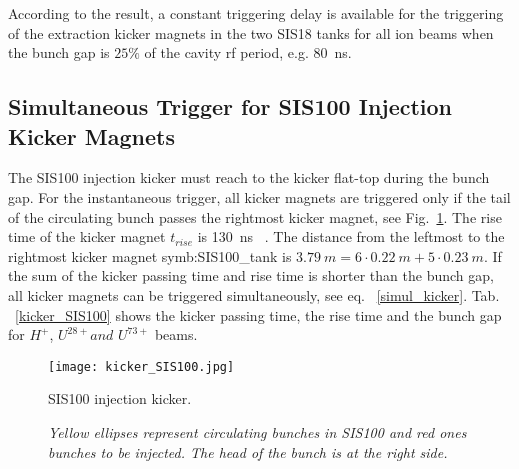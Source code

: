 \begin{table}[H]
\end{table}
According to the result, a constant triggering delay is available for the triggering of the extraction kicker magnets in the two SIS18 tanks for all ion beams when the bunch gap is $25\%$ of the cavity rf period, e.g. \SI{80}{ns}.  

\subsection{Simultaneous Trigger for SIS100 Injection Kicker Magnets}
The SIS100 injection kicker must reach to the kicker flat-top during the bunch gap. For the instantaneous trigger, all kicker magnets are triggered only if the tail of the circulating bunch passes the rightmost kicker magnet, see Fig.~\ref{kicker_SIS1001}. The rise time of the kicker magnet $t_\mathit{rise}$ is \SI{130}{ns} ~\cite{blell_f-ds-ie-03e_2014}. The distance from the leftmost to the rightmost kicker magnet \gls{symb:SIS100_tank} is $\SI{3.79}{m}= 6 \cdot \SI{0.22}{m} + 5 \cdot \SI{0.23}{m}$. If the sum of the kicker passing time and rise time is shorter than the bunch gap, all kicker magnets can be triggered simultaneously, see eq. ~\ref{simul_kicker}. Tab. ~\ref{kicker_SIS100} shows the kicker passing time, the rise time and the bunch gap for $H^+$, $U^{28+} and$ $U^{73+}$ beams. 

\begin{figure}[H]
   \centering   
   \texttt{[image: kicker\_SIS100.jpg]}
   \caption{SIS100 injection kicker.}
	\caption*{\textsl{\small{Yellow ellipses represent circulating bunches in SIS100 and red ones bunches to be injected. The head of the bunch is at the right side.}}}
   \label{kicker_SIS1001}
\end{figure}

